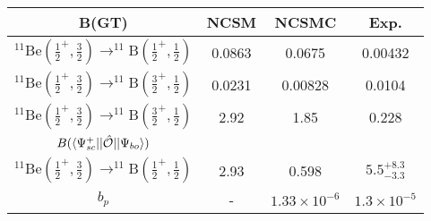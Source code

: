 \documentclass{standalone}
\begin{document}
\begin{tabular}{c|ccc} 

\hline
\hline
B(GT) & NCSM & NCSMC & Exp. \\
\hline
$^{11}$Be$(\frac{1}{2}^+,\frac{3}{2})\rightarrow ^{11}$B$(\frac{1}{2}^+,\frac{1}{2})$ & 0.0863 & 0.0675  & 0.00432 \\
\hline
$^{11}$Be$(\frac{1}{2}^+,\frac{3}{2})\rightarrow ^{11}$B$(\frac{3}{2}^+,\frac{1}{2})$ & 0.0231 & 0.00828 & 0.0104 \\
\hline
$^{11}$Be$(\frac{1}{2}^+,\frac{3}{2})\rightarrow ^{11}$B$(\frac{3}{2}^+,\frac{1}{2})$ & 2.92 & 1.85 & 0.228 \\
\hline
\hline

$B(\braket{\Psi_{sc}^{+}||\hat{\mathcal{O}}||\Psi_{bo}})$ \\
\hline
\hline
$^{11}$Be$(\frac{1}{2}^+,\frac{3}{2})\rightarrow ^{11}$B$(\frac{1}{2}^+,\frac{1}{2})$ & 2.93 & 0.598 & $5.5^{+8.3}_{-3.3}$ \\
\hline
$b_p$ & - & $1.33\times10^{-6}$  & $1.3\times10^{-5}$ \\
\hline

\end{tabular}
\end{document}
